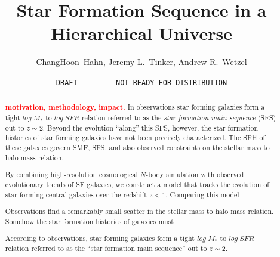 \documentclass[12pt, letterpaper, preprint]{aastex}
\newcommand{\todo}[1]{{\bf \textcolor{red}{#1}}}
\begin{document}
\sloppy\sloppypar\frenchspacing

\title{Star Formation Sequence in a Hierarchical Universe} 
\date{\texttt{DRAFT~---~\githash~---~\gitdate~---~NOT READY FOR DISTRIBUTION}}
\author{ChangHoon~Hahn, 
Jeremy L.~Tinker, 
Andrew R.~Wetzel}

\begin{abstract}
    \todo{motivation, methodology, impact.}
    In observations star forming galaxies form a tight $log\;M_*$ to $log\;SFR$ 
    relation referred to as the {\em star formation main sequence} (SFS) out to $z\sim2$. 
    Beyond the evolution ``along'' this SFS, however, the star formation histories of star 
    forming galaxies have not been precisely characterized. 
    The SFH of these galaxies govern SMF, SFS, and also observed constraints on the stellar mass to halo mass
    relation. 

    By combining high-resolution cosmological $N$-body simulation with observed evolutionary 
    trends of SF galaxies, we construct a model that tracks the evolution of star forming 
    central galaxies over the redshift $z < 1$. Comparing this model 

    Observations find a remarkably small scatter in the stellar mass to halo mass relation. 
    Somehow the star formation histories of galaxies must 
    
    According to observations, star forming galaxies form a tight $log\;M_*$ to $log\;SFR$ 
    relation referred to as the ``star formation main sequence'' out to $z\sim2$. 
\end{abstract}
\end{document}

